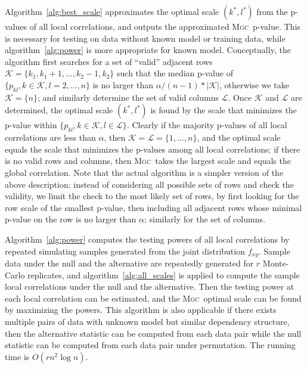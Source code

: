 \documentclass[11pt]{article}
\providecommand{\sct}[1]{{\normalfont\textsc{#1}}}
\newcommand{\K}{\mathcal{K}}
\newcommand{\LL}{\mathcal{L}}
\newcommand{\Mgc}{\sct{Mgc}}
\begin{document}
Algorithm~\ref{alg:best_scale} approximates the optimal scale $(k^{*},l^{*})$ from the p-values of all local correlations, and outputs the approximated \Mgc~p-value. This is necessary for testing on data without known model or training data, while algorithm~\ref{alg:power} is more appropriate for known model. Conceptually, the algorithm first searches for a set of ``valid'' adjacent rows $\K=\{k_{1},k_{1}+1,\ldots,k_{2}-1,k_{2}\}$ such that the median p-value of $\{p_{kl},k \in \K, l=2,\ldots,n\}$
is no larger than $\alpha /(n-1) * |\K|$, otherwise we take $\K=\{n\}$; and similarly determine the set of valid columns $\LL$. Once $\K$ and $\LL$ are determined, the optimal scale $(k^{*},l^{*})$ is found by the scale that minimizes the p-value within $\{p_{kl},k \in \K, l \in \LL\}$. Clearly if the majority p-values of all local correlations are less than $\alpha$, then $\K=\LL=\{1,\ldots,n\}$, and the optimal scale equals the scale that minimizes the p-values among all local correlations; if there is no valid rows and columns, then \Mgc~takes the largest scale and equals the global correlation. Note that the actual algorithm is a simpler version of the above description: instead of considering all possible sets of rows and check the validity, we limit the check to the most likely set of rows, by first looking for the row scale of the smallest p-value, then including all adjacent rows whose minimal p-value on the row is no larger than $\alpha$; similarly for the set of columns.

Algorithm~\ref{alg:power} computes the testing powers of all local correlations by repeated simulating samples generated from the joint distribution $f_{xy}$. Sample data under the null and the alternative are repeatedly generated for $r$ Monte-Carlo replicates, and algorithm~\ref{alg:all_scales} is applied to compute the sample local correlations under the null and the alternative. Then the testing power at each local correlation can be estimated, and the \Mgc~optimal scale can be found by maximizing the powers. This algorithm is also applicable if there exists multiple pairs of data with unknown model but similar dependency structure, then the alternative statistic can be computed from each data pair while the null statistic can be computed from each data pair under permutation. The running time is $O(rn^2 \log n)$.
\end{document}
